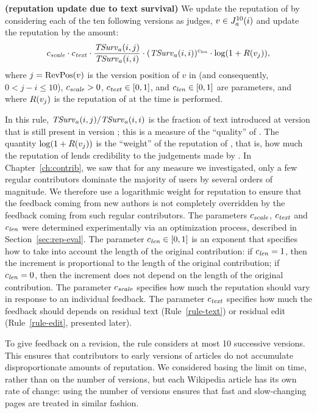 \begin{regola}
\textbf{(reputation update due to text survival)}
\label{rule-text}
  We update the reputation of  by considering
  each of the ten following versions as judges,
  $v \in J_{a}^{10}(i)$ and update the reputation by the amount:
  \[
    {c_{{\text{\textit{scale}}}}} \cdot {c_{{\text{\textit{text}}}}} \cdot \frac{\mathit{TSurv}_{a}(i,j)}{\mathit{TSurv}_{a}(i,i)} 
    \cdot (\mathit{TSurv}_{a}(i,i))^{c_{{\text{\textit{len}}}}} \cdot \log(1 + R(v_{j})),
  \]
  where $j = \mathrm{RevPos}(v)$ is the version position of $v$ in 
  (and consequently, $0 < j - i \le 10$),
  ${c_{{\text{\textit{scale}}}}} > 0$, ${c_{{\text{\textit{text}}}}} \in [0,1]$, and ${c_{{\text{\textit{len}}}}} \in
  [0,1]$ are parameters, and where $R(v_{j})$ is the reputation of
   at the time  is performed.
\end{regola}

\noindent
In this rule, $\mathit{TSurv}_{a}(i,j) / \mathit{TSurv}_{a}(i,i)$ is the fraction of text
introduced at version  that is still present in version ;
this is a measure of the ``quality'' of . 
The quantity $\log(1 + R(v_{j}))$ is the ``weight'' of the
reputation of ,
that is, how much the reputation of  lends
credibility to the judgements made by . 
In Chapter~\ref{ch:contrib}, we saw that for any measure we investigated,
only a few regular contributors dominate the majority of users by
several orders of magnitude.
We therefore use a logarithmic weight for reputation
to ensure that the feedback coming from new authors is not completely
overridden by the feedback coming from such regular contributors. 
The parameters ${c_{{\text{\textit{scale}}}}}$, ${c_{{\text{\textit{text}}}}}$ and ${c_{{\text{\textit{len}}}}}$ were
determined experimentally via an optimization process, described
in Section~\ref{sec:rep-eval}.
The parameter ${c_{{\text{\textit{len}}}}} \in [0,1]$ is an exponent that specifies how
to take into account the length of the original contribution: if
${c_{{\text{\textit{len}}}}} = 1$, then the increment is proportional to the length of
the original contribution; if ${c_{{\text{\textit{len}}}}} = 0$, then the increment
does not depend on the length of the original contribution.
The parameter ${c_{{\text{\textit{scale}}}}}$ specifies how much the reputation should
vary in response to an individual feedback. 
The parameter ${c_{{\text{\textit{text}}}}}$ specifies how much the feedback should 
depends on residual text (Rule~\ref{rule-text}) or residual edit
(Rule~\ref{rule-edit}, presented later). 

To give feedback on a revision, the rule considers at most 10
successive versions. 
This ensures that contributors to early versions of articles do not
accumulate disproportionate amounts of reputation. 
We considered basing the limit on time, rather than on the number of
versions, but each Wikipedia article has its own rate of change:
using the number of versions ensures that fast and
slow-changing pages are treated in similar fashion.


